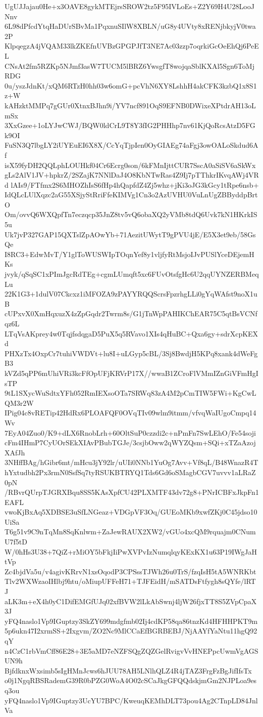 UgUJJajau0He+x3OAVE8gykMTEjrsSROW2tz5F95IVLoEs+Z2Y69H4U28LooJNnv
6L98dPfcdYtqHaDUrSBvMa1PqxnuSIlW8XBLN/uG8y4UVty8xRENjbkyjV0twa2P
KlpqegzA4jVQAM33lkZKEfnUVBzGPGPJfT3NE7Ac03zzp7oqrkiGcOeEhQj6PeEL
CNsAt2fm5RZKp5NJmf3asW7TUCM5lBRZ6YwsgfT8wojqaSblKXAl5Sgn6ToMjRDG
0u/yszJdnKt/xQM6RTzH0hh03w6omG+pcVhN6XY8LshhH4akCFK3kzbQ1x8S1z+W
kAHzktMMPq7gGUr0XtnxBJhn9i/YV7ncf891OqS9EFNB0DWixeXPtdrAH13oLmSx
3XxGzee+1oLYJwCWJ/BQW0ldCrL9T8Y3fIG2PHHhp7nv61KjQoRcsAtzD5FGk9OI
FuSN3Q7lbgLY2iUYEuEI6X8X/CcYqTjpIen0OyGIAEg74aFgj3owOALoSkdud6Af
isX59fyDH2QQLphLOUHkf04Cr6Ecrg0son/6kFMnIjttCUR7SscA0aSiSV6aSkWx
gLs2AlV1JV+hpkrZ/2SZajK7NNlDaJ4O8KbNTwRas4Z9Ij7pTThkrIKvqAWj4VRd
lAIs9/FTfmx2S6MHOZhIsS6fHp4hQapfdZ4Zj5whz+jKi3oJG3kGcy1tRpe6nsb+
IdQLcLUlXqzc2aG55XSjyStRriFfeKIMVg1Cn3o2AzUVHU0VuLnUgZBByddpBrtO
Om/ovvQ6WXQpfTn7eczqcp35JnZ8tv5vQ6obaXQ2yVMb8tdQ6Uvk7kN1HKrkIS5u
Uk7jvP327GAP15QXTslZpAOwYb+71AezitUWytT9gPVU4jE/E5X3et9eb/58GsQe
I8RC3+EdwMvT/Y1glToWUSWIpTOqnYef8y1vljfyRtMsjoIJvPUSlYceDEjemHKs
jvyk/qSqSC1xPImJgcRdTEg+cgmLUmqft5xc6FUvOtsfgHc6U2qqUYNZERBMeqLu
22K1G3+1dulV07Ckcxz1iMFOZA9zPAYYRQQScrsFpzrhgLLi0gYqWAfst9noX1uB
cUPxvX0XmHqxuzX4zZpGqdr2Twrm8s/G1jTnWpPAHIKChEAR75C5qtBsVCNfqz6L
LTqVsAKprey4w0TqjfsdqgaD5PuX5q5RVavo1XIs4qHuBC+Qxa6gy+sdrXcpKEXd
PHXzTx4OxpCr7tuhiVWDVt+lu8I+uLGyp5cBL/3Sj8BwdjH5KPq8xank4dWeFgB3
kVZd5qPP6mUhiVRi3kcFfOpUFjKRVrP17X//wwaB1ZCroFlVMmIZnGiVFmHgIsTP
9tL1SXycWuSdtxYFh052RmIEXsoOTa7SRWq83zA4M2pCmTIW5FWi+KgCwLQM3r2W
IPig04c8vRETip42HdRx6PLOAFQF0OVqTIv09wlm9itmm/vfvqWaIUgoCmpq14Wv
7EyA04Zuo0/K9+dLX6RnobLrh+60OltSuP0czzdi2c+nPmFn7SwLEhO/Fe54soji
cFm4IHmP7CyUOrSEkXIAvPBubTGJe/3csjbOww2qWYZQsm+SQi+xTZaAzojXAfJh
3NHffBAg/hGibr6mt/mHcu3jY92lr/uUIi0NNb1YuOg7Avv+Vf8qL/B48WnazR4T
hYxtudbh2Px3rmN0SsfSq7tyRSUKBTRYQ1Tds6Gd6oSMagbCGV7uvvv1aLRaZ0pN
/RBvrQUrpTJGRXBqu8SS5KAsXpfCU42PLXMTF43dv72g8+PNrICBFxJkpFn1EAFL
vwoKjBxAq5XDBSE3uSfLNGeaz+VDGpVF3Oq/GUEoMKb9xwfZKj0C45jdso10UiSa
T6g51v9C9nTqMn8SqKnlwm+ZaJewRAUX2XW2/vGUo4xcQM9rquajm0CNumU7f5tD
W/0hHs3U38+7QiZ+rMiOY5bFkjIiPwXVPvIzNumqlqyKExKX1u63P19IWgJaHtVp
Zc4bjdVa5u/v4agivKRrvN1xsOqodP3CPSssTJWh26u0TrS/fzqIsH5tA5WNRKbt
Tlv2WXWzaoIHlbj9htu/oMiupUFFeH71+TJFEidH/mSATDsFtfygh8sQYfe/lRTJ
aLK3m+eX4h0yC1DifEMGfUJq02xfBVW2lLkAbSwnj4ljW26fjxTT8S5ZVpCpaX3J
yFQ4naslo1Vp9IGuptzy3SkZY699mdgfmb02Ij4cdKP58qa86tnzKd4HFHHPKT9m
5p6ukn47I2xrmSS+2Ixgvm/ZO2Nc9MlCCaEfBGRBEBJ/NjAAYfYaNtu11hgQ92qY
n4CzC1rbVmCff86E28+3E5aMD7eNZFSQgZQZGelRvigvVvHNEPpcUwmVgAGSUN9h
BjfdknxWxsimb5sIgHMnJcws6hJUU78AH5LNlhQLZ4R4jTAZ3FrgFzBgJifIfsTx
o0j1NgqRBSRademG39R0bPZG0WoA4O02cSCaJkgGFQQdskjmGm2NJPLoa9esq3ou
yFQ4naslo1Vp9IGuptzy3UcYU7BPC/KweuqKEMhDLT73pou4Ag2CTnpLD84JnlVa
